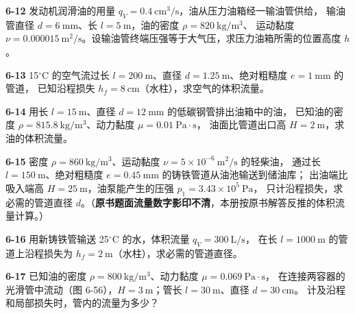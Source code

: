 \begin{ti}
\item[\textbf{6-12}] 发动机润滑油的用量 $q_V=0.4\ \mathrm{cm^3/s}$，油从压力油箱经一输油管供给，
输油管直径 $d=6\ \mathrm{mm}$、长 $l=5\ \mathrm{m}$，油的密度 $\rho=820\ \mathrm{kg/m^3}$、
运动黏度 $\nu=0.000015\ \mathrm{m^2/s}$。设输油管终端压强等于大气压，求压力油箱所需的位置高度 $h$。
\quad{}\quad{}

\item[\textbf{6-13}] 15$^\circ$C 的空气流过长 $l=200\ \mathrm{m}$、直径 $d=1.25\ \mathrm{m}$、绝对粗糙度 $e=1\ \mathrm{mm}$ 的管道，
已知沿程损失 $h_f=8\ \mathrm{cm}$（水柱），求空气的体积流量。
\quad{}\quad{}

\item[\textbf{6-14}] 用长 $l=15\ \mathrm{m}$、直径 $d=12\ \mathrm{mm}$ 的低碳钢管排出油箱中的油，
已知油的密度 $\rho=815.8\ \mathrm{kg/m^3}$、动力黏度 $\mu=0.01\ \mathrm{Pa\cdot s}$，
油面比管道出口高 $H=2\ \mathrm{m}$，求油的体积流量。
\quad{}\quad{}

\item[\textbf{6-15}] 密度 $\rho=860\ \mathrm{kg/m^3}$、运动黏度 $\nu=5\times10^{-6}\ \mathrm{m^2/s}$ 的轻柴油，
通过长 $l=150\ \mathrm{m}$、绝对粗糙度 $e=0.45\ \mathrm{mm}$ 的铸铁管道从油池输送到储油库；
出油端比吸入端高 $H=25\ \mathrm{m}$，油泵能产生的压强 $p_1=3.43\times10^5\ \mathrm{Pa}$，
只计沿程损失，求必需的管道直径 $d$。（\textbf{原书题面流量数字影印不清}，本册按原书解答反推的体积流量计算。）
\quad{}\quad{}

\item[\textbf{6-16}] 用新铸铁管输送 25$^\circ$C 的水，体积流量 $q_V=300\ \mathrm{L/s}$，
在长 $l=1000\ \mathrm{m}$ 的管道上沿程损失为 $h_f=2\ \mathrm{m}$（水柱），求必需的管道直径。
\quad{}\quad{}

\item[\textbf{6-17}] 已知油的密度 $\rho=800\ \mathrm{kg/m^3}$、动力黏度 $\mu=0.069\ \mathrm{Pa\cdot s}$，
在连接两容器的光滑管中流动（图 6-56），$H=3\ \mathrm{m}$；管长 $l=30\ \mathrm{m}$、直径 $d=30\ \mathrm{cm}$。
计及沿程和局部损失时，管内的流量为多少？
\quad{}\quad{}


\end{ti}
